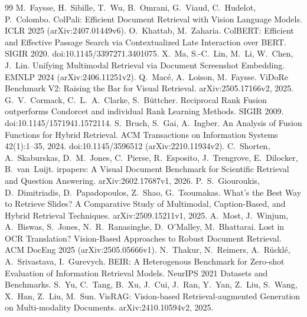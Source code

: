 \documentclass[11pt,a4paper]{article}
\begin{document}
\begin{thebibliography}{99}\small
{} M.~Faysse, H.~Sibille, T.~Wu, B.~Omrani, G.~Viaud, C.~Hudelot, P.~Colombo. ColPali: Efficient Document Retrieval with Vision Language Models. ICLR 2025 (arXiv:2407.01449v6).
 O.~Khattab, M.~Zaharia. ColBERT: Efficient and Effective Passage Search via Contextualized Late Interaction over BERT. SIGIR 2020. doi:10.1145/3397271.3401075.
 X.~Ma, S.-C.~Lin, M.~Li, W.~Chen, J.~Lin. Unifying Multimodal Retrieval via Document Screenshot Embedding. EMNLP 2024 (arXiv:2406.11251v2).
 Q.~Macé, A.~Loison, M.~Faysse. ViDoRe Benchmark V2: Raising the Bar for Visual Retrieval. arXiv:2505.17166v2, 2025.
 G.~V.~Cormack, C.~L.~A.~Clarke, S.~Büttcher. Reciprocal Rank Fusion outperforms Condorcet and individual Rank Learning Methods. SIGIR 2009. doi:10.1145/1571941.1572114.
 S.~Bruch, S.~Gai, A.~Ingber. An Analysis of Fusion Functions for Hybrid Retrieval. ACM Transactions on Information Systems 42(1):1--35, 2024. doi:10.1145/3596512 (arXiv:2210.11934v2).
 C.~Shorten, A.~Skaburskas, D.~M.~Jones, C.~Pierse, R.~Esposito, J.~Trengrove, E.~Dilocker, B.~van~Luijt. irpapers: A Visual Document Benchmark for Scientific Retrieval and Question Answering. arXiv:2602.17687v1, 2026.
 P.~S.~Giouroukis, D.~Dimitriadis, D.~Papadopoulos, Z.~Shao, G.~Tsoumakas. What's the Best Way to Retrieve Slides? A Comparative Study of Multimodal, Caption-Based, and Hybrid Retrieval Techniques. arXiv:2509.15211v1, 2025.
 A.~Most, J.~Winjum, A.~Biswas, S.~Jones, N.~R.~Ranasinghe, D.~O'Malley, M.~Bhattarai. Lost in OCR Translation? Vision-Based Approaches to Robust Document Retrieval. ACM DocEng 2025 (arXiv:2505.05666v1).
 N.~Thakur, N.~Reimers, A.~Rücklé, A.~Srivastava, I.~Gurevych. BEIR: A Heterogenous Benchmark for Zero-shot Evaluation of Information Retrieval Models. NeurIPS 2021 Datasets and Benchmarks.
 S.~Yu, C.~Tang, B.~Xu, J.~Cui, J.~Ran, Y.~Yan, Z.~Liu, S.~Wang, X.~Han, Z.~Liu, M.~Sun. VisRAG: Vision-based Retrieval-augmented Generation on Multi-modality Documents. arXiv:2410.10594v2, 2025.
\end{thebibliography}
\end{document}
